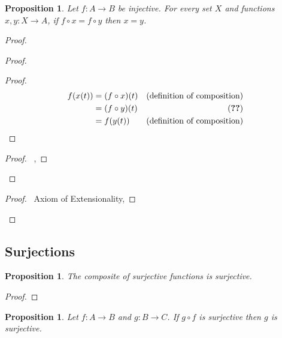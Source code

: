 \documentclass{book}
\let\qed\relax
\newtheorem{prop}[ax]{Proposition}
\theoremstyle{definition}
\begin{document}
\begin{prop}
\label{prop:injective}
Let $f : A \rightarrow B$ be injective. For every set $X$ and functions $x,y : X \rightarrow A$, if $f \circ x = f \circ y$ then $x = y$.
\end{prop}

\begin{proof}
\pf
	\begin{proof}
		\begin{proof}
			\pf
			\begin{align*}
				f(x(t)) & = (f \circ x)(t) & (\text{definition of composition}) \\
				& = (f \circ y)(t) & (\text{\stepref{d}}) \\
				& = f(y(t)) & (\text{definition of composition})
			\end{align*}
		\end{proof}
		\begin{proof}
			\pf\ , 
		\end{proof}
	\end{proof}
	\begin{proof}
		\pf\ Axiom of Extensionality, 
	\end{proof}
\qed
\end{proof}

\subsection{Surjections} %

\begin{prop}
\label{prop:comp_surj}
The composite of surjective functions is surjective.
\end{prop}

\begin{proof}
\pf
{}
\qed
\end{proof}

\begin{prop}
Let $f : A \rightarrow B$ and $g : B \rightarrow C$. If $g \circ f$ is surjective then $g$ is surjective.
\end{prop}
\end{document}
